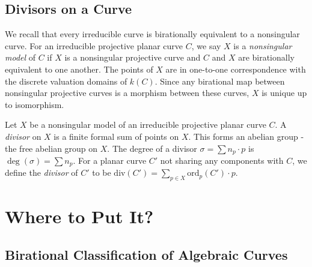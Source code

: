 \section{Divisors on a Curve}

We recall that every irreducible curve is birationally equivalent to a nonsingular curve. For an irreducible projective planar curve $C$, we say $X$ is a \emph{nonsingular model} of $C$ if $X$ is a nonsingular projective curve and $C$ and $X$ are birationally equivalent to one another. The points of $X$ are in one-to-one correspondence with the discrete valuation domains of $k(C)$. Since any birational map between nonsingular projective curves is a morphism between these curves, $X$ is unique up to isomorphism.

Let $X$ be a nonsingular model of an irreducible projective planar curve $C$. A \emph{divisor} on $X$ is a finite formal sum of points on $X$. This forms an abelian group - the free abelian group on $X$. The degree of a divisor $\sigma = \sum n_p \cdot p$ is $\deg(\sigma) = \sum n_p$. For a planar curve $C'$ not sharing any components with $C$, we define the \emph{divisor} of $C'$ to be $\text{div}(C') = \sum_{p \in X} \text{ord}_p(C') \cdot p$.



















\chapter{Where to Put It?}

\section{Birational Classification of Algebraic Curves}

